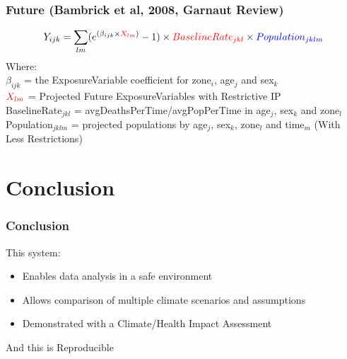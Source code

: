 \documentclass[bigger]{beamer}
\begin{document}
\begin{frame}
\frametitle{Future (Bambrick et al, 2008, Garnaut Review)}
\label{sec-3-2}

\begin{footnotesize}
$$Y_{ijk}=\sum_{lm}(e^{(\beta_{ijk} \times {\color{red} X_{lm}})} - 1) \times {\color{red}BaselineRate_{jkl}} \times {\color{blue} Population_{jklm}}$$
\noindent Where:\\
$\beta_{ijk}$ = the ExposureVariable coefficient for zone$_i$, age$_j$ and sex$_{k}$ \\
${\color{red}X_{lm}}$ = Projected Future ExposureVariables {\color{red} with Restrictive IP} \\
{\color{red}BaselineRate$_{jkl}$} = {\color{red}avgDeathsPerTime}/{\color{blue}avgPopPerTime} in age$_j$, sex$_k$ and zone$_l$ \\
{\color{blue}Population$_{jklm}$} = projected populations by age$_j$, sex$_k$, zone$_l$ and time$_m$ {\color{blue} (With Less Restrictions)}\\

\end{footnotesize}
\end{frame}
\section{Conclusion}
\label{sec-4}
\begin{frame}
\frametitle{Conclusion}
\label{sec-4-1}

This system:
\begin{itemize}
\item Enables data analysis in a safe environment
\item Allows comparison of multiple climate scenarios and assumptions
\item Demonstrated with a Climate/Health Impact Assessment
\end{itemize}
\begin{itemize}
\begin{large}
\item And this is Reproducible
\end{large}
\end{itemize}
\end{frame}
\end{document}
